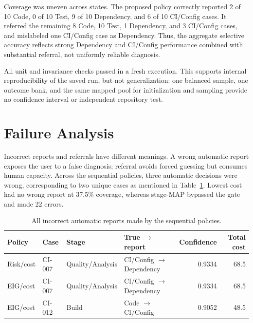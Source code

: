\documentclass{article}
\begin{document}
Coverage was uneven across states. The proposed policy correctly reported 2 of
10 Code, 0 of 10 Test, 9 of 10 Dependency, and 6 of 10 CI/Config cases. It
referred the remaining 8 Code, 10 Test, 1 Dependency, and 3 CI/Config cases,
and mislabeled one CI/Config case as Dependency. Thus, the aggregate selective
accuracy reflects strong Dependency and CI/Config performance combined with
substantial referral, not uniformly reliable diagnosis.

All unit and invariance checks passed in a fresh execution. This supports
internal reproducibility of the saved run, but not generalization: one balanced
sample, one outcome bank, and the same mapped pool for initialization and
sampling provide no confidence interval or independent repository test.

\section{Failure Analysis}
\label{sec:failure_analysis}

Incorrect reports and referrals have different meanings. A wrong automatic
report exposes the user to a false diagnosis; referral avoids forced guessing
but consumes human capacity. Across the sequential policies, three automatic
decisions were wrong, corresponding to two unique cases as mentioned in Table~\ref{tab:sequential_errors}. Lowest cost had no wrong report at 37.5\%
coverage, whereas stage-MAP bypassed the gate and made 22 errors.

\begin{table}[!h]
\renewcommand{\arraystretch}{1.2}
\centering
\caption{All incorrect automatic reports made by the sequential policies.}
\label{tab:sequential_errors}
\footnotesize
\begin{tabular*}{\textwidth}{@{\extracolsep{\fill}}llllrr@{}}
\toprule
Policy & Case & Stage & True $\rightarrow$ report & Confidence & Total cost \\
\midrule
Risk/cost & CI-007 & Quality/Analysis &
CI/Config $\rightarrow$ Dependency & 0.9334 & 68.5 \\
EIG/cost & CI-007 & Quality/Analysis &
CI/Config $\rightarrow$ Dependency & 0.9334 & 68.5 \\
EIG/cost & CI-012 & Build &
Code $\rightarrow$ CI/Config & 0.9052 & 48.5 \\
\bottomrule
\end{tabular*}
\end{table}
\end{document}
